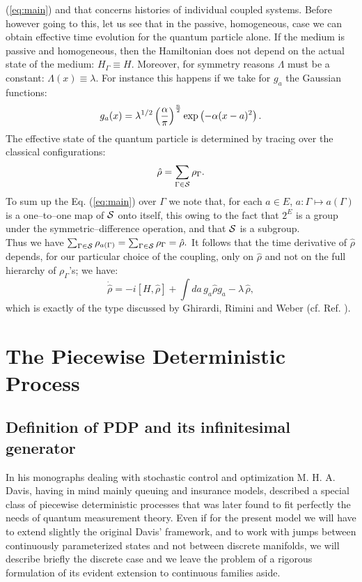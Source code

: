 \documentclass[12pt]{article}
\def\be{\begin{equation}}
\def\ee{\end{equation}}
\begin{document}
(\ref{eq:main}) and that concerns histories of individual coupled systems.
Before however going to this, let us see that in the passive, homogeneous,
case we can obtain effective time evolution for the quantum particle alone.
If the medium is passive and homogeneous, then the Hamiltonian does not
depend on the actual state of the medium: $H_\Gamma\equiv H$. Moreover, for
symmetry reasons $\Lambda$ must be a constant: $\Lambda(x)\equiv\lambda$.
For instance this happens if we take for $g_a$ the Gaussian functions: \be
g_a(x)=\lambda^{1/2}\left({\alpha\over\pi}\right)^{n\over 2}
\exp\left({-\alpha (x-a)^2}\right). \ee The effective state of the quantum
particle is determined by tracing over the classical configurations: \be
{\hat\rho}=\sum_{\Gamma\in{\cal S}} \rho_\Gamma. \ee To sum up the Eq.
(\ref{eq:main}) over $\Gamma$ we note that, for each $a\in E$,
$a:\Gamma\mapsto a(\Gamma)$ is a one--to--one map of ${\cal S}$ onto
itself, this owing to the fact that $2^E$ is a group under the
symmetric--difference operation, and that ${\cal S}$ is a subgroup.\\ Thus
we have $\sum_{\Gamma\in{\cal S}}\rho_{a(\Gamma)}= \sum_{\Gamma\in{\cal
S}}\rho_\Gamma={\hat\rho}.$ It follows that the time derivative of
${\hat\rho}$ depends, for our particular choice of the coupling, only on
${\hat\rho}$ and not on the full hierarchy of $\rho_\Gamma$'s; we have: \be
{\dot {\hat\rho}} = -i[H,{\hat\rho}]+\int da\, g_a{\hat\rho} g_a -\lambda\,
{\hat\rho },\ee which is exactly of the type discussed by Ghirardi, Rimini
and Weber (cf. Ref. \cite{ghi1}).
\section{The Piecewise Deterministic Process}
\subsection{Definition of  PDP  and its infinitesimal generator}
In his monographs \cite{davmha1,davmha2} dealing with stochastic control
and optimization M. H. A. Davis, having in mind mainly queuing and
insurance models, described a special class of piecewise deterministic
processes that was later found to fit perfectly the needs of quantum
measurement theory. Even if for the present model we will have to extend
slightly the original Davis' framework, and to work with jumps between
continuously parameterized states and not between discrete manifolds, we
will describe briefly the discrete case and we leave the problem of a
rigorous formulation of its evident extension to continuous families
aside.
\end{document}
